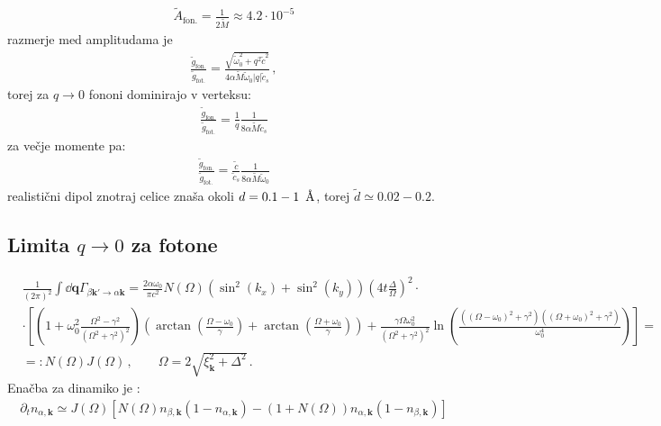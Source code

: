 \documentclass[a4paper,10pt]{article}
\renewcommand{\vec}[1]{\mathbf{#1}}
\begin{document}
\begin{align}
  \tilde{A}_{\text{fon.}} = \frac{1}{2\tilde{M}} \approx 4.2 \cdot 10^{-5}
\end{align}
razmerje med amplitudama je
\begin{align}
  \frac{\tilde{g}_\text{fon.}}{\tilde{g}_\text{fot.}} = \frac{\sqrt{\tilde{\omega}_0^2 + q^2 \tilde{c}^2}}{4\alpha \tilde{M} \tilde{\omega}_0 |q| \tilde{c}_s}\,,
\end{align}
torej za $q\to 0$ fononi dominirajo v verteksu: 
\begin{align}
   \frac{\tilde{g}_\text{fon.}}{\tilde{g}_\text{fot.}} = \frac{1}{q} \frac{1}{8\alpha \tilde{M} \tilde{c}_s}
\end{align}
za večje momente pa: 
\begin{align}
   \frac{\tilde{g}_\text{fon.}}{\tilde{g}_\text{fot.}} = \frac{\tilde{c}}{\tilde{c}_s} \frac{1}{8\alpha \tilde{M} \tilde{\omega}_0}
\end{align}
realistični dipol znotraj celice znaša okoli $d = 0.1  - 1\, \textup{~\AA}$, torej $\tilde{d} \simeq 0.02-0.2$. 

\subsection{Limita $q\to 0$ za fotone}
\begin{align}
  &\frac{1}{(2\pi)^2} \int \dd{\vec{q}} \Gamma_{\beta \vec{k}'\to \alpha\vec{k}} = \frac{2\alpha\omega_0}{\pi c^2} N(\Omega) \left(\sin^2(k_x) + \sin^2(k_y)\right) \left(4 t \frac{\Delta}{\Omega}\right)^2 \cdot \nonumber \\
  &\cdot \left[ \left( 1 + \omega_0^2 \frac{\Omega^2 - \gamma^2}{(\Omega^2 + \gamma^2)^2}\right) \left( \operatorname{arctan}\left(\frac{\Omega - \omega_0}{\gamma}\right) + \operatorname{arctan}\left(\frac{\Omega + \omega_0}{\gamma}\right) \right) + \frac{\gamma \Omega \omega_0^2}{(\Omega^2 + \gamma^2)^2} \ln\left( \frac{((\Omega-\omega_0)^2 + \gamma^2)((\Omega+\omega_0)^2 + \gamma^2)}{\omega_0^4} \right)  \right] = \nonumber\\
  &=: N(\Omega)J(\Omega)\,,\qquad \Omega = 2\sqrt{\xi_\vec{k}^2+\Delta^2}\,.
\end{align}
Enačba za dinamiko je : 
\begin{align}
  \partial_t n_{\alpha,\vec{k}} \simeq J(\Omega)\left[N(\Omega)n_{\beta,\vec{k}}(1-n_{\alpha,\vec{k}}) - (1+N(\Omega)) n_{\alpha,\vec{k}}(1-n_{\beta,\vec{k}})\right]
\end{align}
\end{document}
